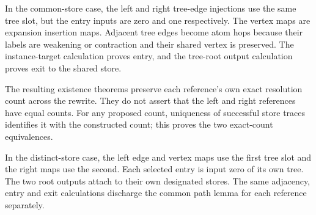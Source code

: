 
In the common-store case, the left and right tree-edge injections use the
same tree slot, but the entry inputs are zero and one respectively. The
vertex maps are expansion insertion maps. Adjacent tree edges become atom
hops because their labels are weakening or contraction and their shared
vertex is preserved. The instance-target calculation proves entry, and
the tree-root output calculation proves exit to the shared store.











The resulting existence theorems preserve each reference's own exact
resolution count across the rewrite. They do not assert that the left
and right references have equal counts. For any proposed count, uniqueness
of successful store traces identifies it with the constructed count; this
proves the two exact-count equivalences.



In the distinct-store case, the left edge and vertex maps use the first
tree slot and the right maps use the second. Each selected entry is input
zero of its own tree. The two root outputs attach to their own designated
stores. The same adjacency, entry and exit calculations discharge the
common path lemma for each reference separately.

